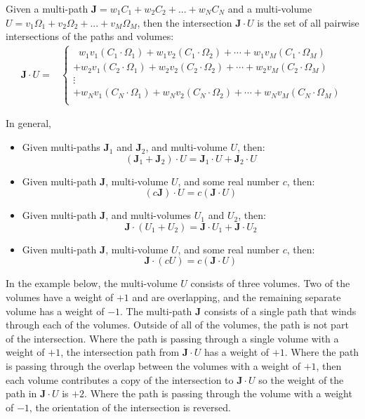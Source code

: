 Given a multi-path \(\mathbf{J} = w_1 C_1 + w_2 C_2 + ... + w_N C_N\) and a multi-volume \\ \(U = v_1 \Omega_1 + v_2\Omega_2 + ... + v_M\Omega_M\), then the intersection \(\mathbf{J} \cdot U\) is the set of all pairwise intersections of the paths and volumes:
\begin{align*}
\mathbf{J} \cdot U = & \left\{\begin{array}{c}
\;\; w_1 v_1 (C_1 \cdot \Omega_1) + w_1 v_2 (C_1 \cdot \Omega_2) + \cdots + w_1 v_M (C_1 \cdot \Omega_M) \\ 
+ w_2 v_1 (C_2 \cdot \Omega_1) + w_2 v_2 (C_2 \cdot \Omega_2) + \cdots + w_2 v_M (C_2 \cdot \Omega_M) \\ 
\vdots \\
+ w_N v_1 (C_N \cdot \Omega_1) + w_N v_2 (C_N \cdot \Omega_2) + \cdots + w_N v_M (C_N \cdot \Omega_M) \\ 
\end{array}\right.
\end{align*}

In general,
\begin{itemize}
\item Given multi-paths \(\mathbf{J}_1\) and \(\mathbf{J}_2\), and multi-volume \(U\), then:
\[(\mathbf{J}_1 + \mathbf{J}_2) \cdot U = \mathbf{J}_1 \cdot U + \mathbf{J}_2 \cdot U\] 
\item Given multi-path \(\mathbf{J}\), multi-volume \(U\), and some real number \(c\), then:
\[(c\mathbf{J}) \cdot U = c(\mathbf{J} \cdot U)\]
\item Given multi-path \(\mathbf{J}\), and multi-volumes \(U_1\) and \(U_2\), then:
\[\mathbf{J} \cdot (U_1 + U_2) = \mathbf{J} \cdot U_1 + \mathbf{J} \cdot U_2\] 
\item Given multi-path \(\mathbf{J}\), multi-volume \(U\), and some real number \(c\), then:
\[\mathbf{J} \cdot (cU) = c(\mathbf{J} \cdot U)\]
\end{itemize}

In the example below, the multi-volume \(U\) consists of three volumes. Two of the volumes have a weight of \(+1\) and are overlapping, and the remaining separate volume has a weight of \(-1\). The multi-path \(\mathbf{J}\) consists of a single path that winds through each of the volumes. Outside of all of the volumes, the path is not part of the intersection. Where the path is passing through a single volume with a weight of \(+1\), the intersection path from \(\mathbf{J} \cdot U\) has a weight of \(+1\). Where the path is passing through the overlap between the volumes with a weight of \(+1\), then each volume contributes a copy of the intersection to \(\mathbf{J} \cdot U\) so the weight of the path in \(\mathbf{J} \cdot U\) is \(+2\). Where the path is passing through the volume with a weight of \(-1\), the orientation of the intersection is reversed.  

